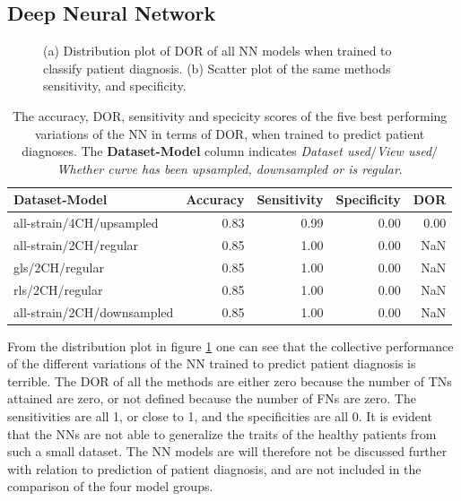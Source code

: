 \newpage

\subsection{Deep Neural Network}

\begin{figure}[H]
    \centering
    
    \caption{(a) Distribution plot of DOR of all NN models when trained to classify patient diagnosis.
             (b) Scatter plot of the same methods sensitivity, and specificity.}
    \label{fig:dl_ind_dor_sens_spec_dist}
\end{figure}

\begin{table}
    \centering
    \begin{tabular}{lrrrr}
        \toprule
        Dataset-Model              &  Accuracy &  Sensitivity &  Specificity &  DOR \\
        \midrule
        all-strain/4CH/upsampled   &      0.83 &         0.99 &         0.00 & 0.00 \\
        all-strain/2CH/regular     &      0.85 &         1.00 &         0.00 &  NaN \\
        gls/2CH/regular            &      0.85 &         1.00 &         0.00 &  NaN \\
        rls/2CH/regular            &      0.85 &         1.00 &         0.00 &  NaN \\
        all-strain/2CH/downsampled &      0.85 &         1.00 &         0.00 &  NaN \\
        \bottomrule
    \end{tabular}
    \caption{The accuracy, DOR, sensitivity and specicity scores of the five best performing variations of the NN in terms of DOR, when trained to predict patient diagnoses.
             The \textbf{Dataset-Model} column indicates \textit{Dataset used}$/$\textit{View used}$/$\textit{Whether curve has been upsampled, downsampled or is regular}.}
    \label{tab:dl_hf_dor_sens_spec_dist}
\end{table}

From the distribution plot in figure \ref{fig:dl_ind_dor_sens_spec_dist} one can see that the collective performance of the different variations of the NN trained to predict patient diagnosis
is terrible.
The DOR of all the methods are either zero because the number of TNs attained are zero, or not defined because the number of FNs are zero. 
The sensitivities are all 1, or close to 1, and the specificities are all 0. 
It is evident that the NNs are not able to generalize the traits of the healthy patients from such a small dataset. 
The NN models are will therefore not be discussed further with relation to prediction of patient diagnosis, and are not included in the comparison of the four model groups.


